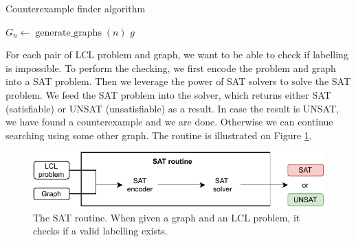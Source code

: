 \begin{algorithm}
    \caption{Counterexample finder algorithm}
    \label{alg:test}
    \begin{algorithmic}[1] %
         
             
                \State $G_n \gets \operatorname{generate\_graphs}(n)$ 
                        \State \Return $g$
                    \EndIf
                \EndFor
            \EndFor\label{euclidendwhile}
            \State \Return {}
        \EndProcedure
    \end{algorithmic}
\end{algorithm}



For each pair of LCL problem and graph, we want to be able to check if labelling is impossible.
To perform the checking, we first encode the problem and graph into a SAT problem.
Then we leverage the power of SAT solvers to solve the SAT problem.
We feed the SAT problem into the solver, which returns either SAT (satisfiable) or UNSAT (unsatisfiable) as a result.
In case the result is UNSAT, we have found a counterexample and we are done.
Otherwise we can continue searching using some other graph.
The routine is illustrated on Figure \ref{fig:implementatio:idea:1}.

\begin{figure}[H]
\centering
\includegraphics[]{diagrams/implementation_idea_diagram2.pdf}
\caption{The SAT routine. When given a graph and an LCL problem, it checks if a valid labelling exists.}
\label{fig:implementatio:idea:1}
\end{figure}

